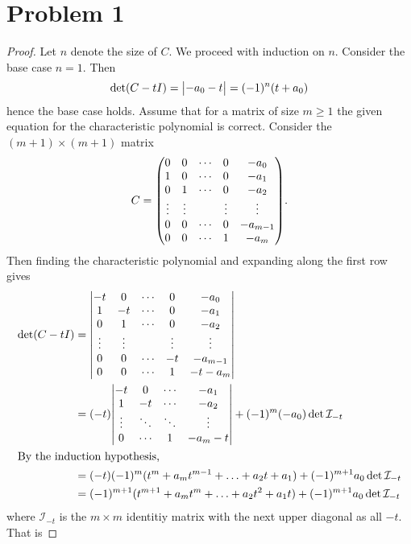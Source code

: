 \documentclass{article}
\begin{document}
\section*{Problem 1}
\begin{proof}
    Let $n$ denote the size of $C$. We proceed with induction on $n$. Consider the base case $n = 1$. Then
    \[
        \det(C - t I) = \mqty| -a_0 - t | = (-1)^n (t + a_0)
    \]
    hence the base case holds. Assume that for a matrix of size $m \geq 1$ the given equation for the characteristic polynomial is correct. Consider the $(m+1) \times (m+1)$ matrix
    \[
        C = \mqty(
        0 & 0 & \cdots & 0 & -a_0 \\
        1 & 0 & \cdots & 0 & -a_1 \\
        0 & 1 & \cdots & 0 & -a_2 \\
        \vdots & \vdots & & \vdots & \vdots \\
        0 & 0 & \cdots & 0 & -a_{m-1} \\
        0 & 0 & \cdots & 1 & -a_{m} \\
        )
    .\]
    Then finding the characteristic polynomial and expanding along the first row gives
    \begin{align*}
        \det(C - tI) &= \mqty|
        -t & 0 & \cdots & 0 & -a_0 \\
        1 & -t & \cdots & 0 & -a_1 \\
        0 & 1 & \cdots & 0 & -a_2 \\
        \vdots & \vdots & & \vdots & \vdots \\
        0 & 0 & \cdots & -t & -a_{m-1} \\
        0 & 0 & \cdots & 1 & -t - a_{m} \\
        | \\
        &= (-t)\mqty|
        -t & 0 & \cdots & -a_1 \\
        1 & -t & \cdots & -a_2 \\
        \vdots & \ddots & \ddots & \vdots \\
        0 & \cdots & 1 & -a_m - t
        | + (-1)^{m} (-a_0) \det \mathcal{I}_{-t} \\
        \intertext{By the induction hypothesis,}
          &= (-t)(-1)^{m} (t^m + a_{m} t^{m-1} + \ldots + a_2 t + a_1) + (-1)^{m+1} a_0 \det \mathcal{I}_{-t} \\
          &= (-1)^{m+1} (t^{m+1} + a_{m} t^{m} + \ldots + a_2 t^2 + a_1 t) + (-1)^{m+1} a_0 \det \mathcal{I}_{-t}
    \end{align*}
    where $\mathcal{I}_{-t}$ is the $m\times m$ identitiy matrix with the next upper diagonal as all $-t$. That is

\end{proof}
\end{document}
